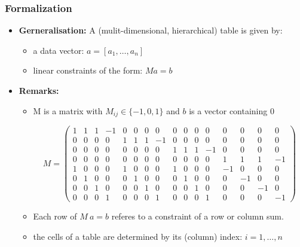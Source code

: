 \begin{frame}\frametitle{Formalization}
	\begin{itemize}
		\item {\bf Gerneralisation:} A (mulit-dimensional, hierarchical) table is given by: \pause
		\begin{itemize}
			\item a data vector: $a = [a_1,\ldots, a_n]$ \pause
			\item linear constraints of the form: $M a = b$ \pause
		\end{itemize}		
		\item {\bf Remarks:}
		\begin{itemize}
			\item M is a matrix with $M_{ij} \in \{-1,0,1\}$ and $b$ is a vector containing $0$ \pause
			\begin{tiny}
			\[ M = \left( \begin{array}{cccccccccccccccc}
			1 & 1 & 1 & -1 & 0 & 0 & 0 & 0 & 0 & 0 & 0 & 0 & 0 & 0 & 0 & 0 \\
			0 & 0 & 0 & 0 & 1 & 1 & 1 & -1 & 0 & 0 & 0 & 0 & 0 & 0 & 0 & 0 \\
			0 & 0 & 0 & 0 & 0 & 0 & 0 & 0 & 1 & 1 & 1 & -1 & 0 & 0 & 0 & 0 \\
			0 & 0 & 0 & 0 & 0 & 0 & 0 & 0 & 0 & 0 & 0 & 0 & 1 & 1 & 1 & -1 \\			
			1 & 0 & 0 & 0 & 1 & 0 & 0 & 0 & 1 & 0 & 0 & 0 & -1 & 0 & 0 & 0 \\
			0 & 1 & 0 & 0 & 0 & 1 & 0 & 0 & 0 & 1 & 0 & 0 & 0 & -1 & 0 & 0 \\
			0 & 0 & 1 & 0 & 0 & 0 & 1 & 0 & 0 & 0 & 1 & 0 & 0 & 0 & -1 & 0 \\
			0 & 0 & 0 & 1 & 0 & 0 & 0 & 1 & 0 & 0 & 0 & 1 & 0 & 0 & 0 & -1 \end{array} \right)\] 
			\end{tiny} \pause
			\item Each row of $M~a=b$ referes to a constraint of a row or column sum. \pause
			\item the cells of a table are determined by its  (column) index: $i=1,\ldots,n$
		\end{itemize}			
	\end{itemize}
\end{frame}
